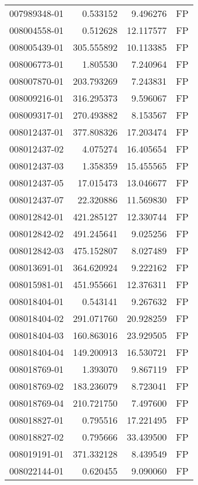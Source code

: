 \begin{tabular}{lrrl}
007989348-01 &    0.533152 &       9.496276 &   FP \\
008004558-01 &    0.512628 &      12.117577 &   FP \\
008005439-01 &  305.555892 &      10.113385 &   FP \\
008006773-01 &    1.805530 &       7.240964 &   FP \\
008007870-01 &  203.793269 &       7.243831 &   FP \\
008009216-01 &  316.295373 &       9.596067 &   FP \\
008009317-01 &  270.493882 &       8.153567 &   FP \\
008012437-01 &  377.808326 &      17.203474 &   FP \\
008012437-02 &    4.075274 &      16.405654 &   FP \\
008012437-03 &    1.358359 &      15.455565 &   FP \\
008012437-05 &   17.015473 &      13.046677 &   FP \\
008012437-07 &   22.320886 &      11.569830 &   FP \\
008012842-01 &  421.285127 &      12.330744 &   FP \\
008012842-02 &  491.245641 &       9.025256 &   FP \\
008012842-03 &  475.152807 &       8.027489 &   FP \\
008013691-01 &  364.620924 &       9.222162 &   FP \\
008015981-01 &  451.955661 &      12.376311 &   FP \\
008018404-01 &    0.543141 &       9.267632 &   FP \\
008018404-02 &  291.071760 &      20.928259 &   FP \\
008018404-03 &  160.863016 &      23.929505 &   FP \\
008018404-04 &  149.200913 &      16.530721 &   FP \\
008018769-01 &    1.393070 &       9.867119 &   FP \\
008018769-02 &  183.236079 &       8.723041 &   FP \\
008018769-04 &  210.721750 &       7.497600 &   FP \\
008018827-01 &    0.795516 &      17.221495 &   FP \\
008018827-02 &    0.795666 &      33.439500 &   FP \\
008019191-01 &  371.332128 &       8.439549 &   FP \\
008022144-01 &    0.620455 &       9.090060 &   FP \\

\end{tabular}
